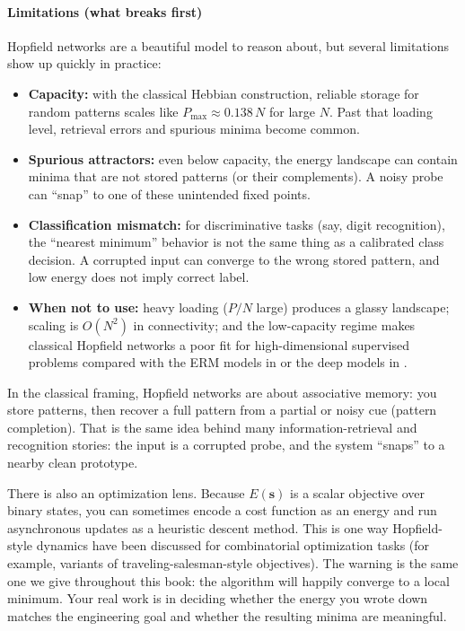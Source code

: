 \paragraph{Limitations (what breaks first)}
Hopfield networks are a beautiful model to reason about, but several limitations show up quickly in practice:
\begin{itemize}
    \item \textbf{Capacity:} with the classical Hebbian construction, reliable storage for random patterns scales like \(P_{\max}\approx 0.138\,N\) for large \(N\). Past that loading level, retrieval errors and spurious minima become common.
    \item \textbf{Spurious attractors:} even below capacity, the energy landscape can contain minima that are not stored patterns (or their complements). A noisy probe can ``snap'' to one of these unintended fixed points.
    \item \textbf{Classification mismatch:} for discriminative tasks (say, digit recognition), the ``nearest minimum'' behavior is not the same thing as a calibrated class decision. A corrupted input can converge to the wrong stored pattern, and low energy does not imply correct label.
    \item \textbf{When not to use:} heavy loading (\(P/N\) large) produces a glassy landscape; scaling is \(O(N^2)\) in connectivity; and the low\hyp{}capacity regime makes classical Hopfield networks a poor fit for high\hyp{}dimensional supervised problems compared with the ERM models in  or the deep models in .
\end{itemize}

\begin{tcolorbox}[summarybox, title={Applications lens: memory retrieval and optimization}]
In the classical framing, Hopfield networks are about associative memory: you store patterns, then recover a full pattern from a partial or noisy cue (pattern completion). That is the same idea behind many information-retrieval and recognition stories: the input is a corrupted probe, and the system ``snaps'' to a nearby clean prototype.

There is also an optimization lens. Because \(E(\mathbf{s})\) is a scalar objective over binary states, you can sometimes encode a cost function as an energy and run asynchronous updates as a heuristic descent method. This is one way Hopfield-style dynamics have been discussed for combinatorial optimization tasks (for example, variants of traveling-salesman-style objectives). The warning is the same one we give throughout this book: the algorithm will happily converge to a local minimum. Your real work is in deciding whether the energy you wrote down matches the engineering goal and whether the resulting minima are meaningful.
\end{tcolorbox}

